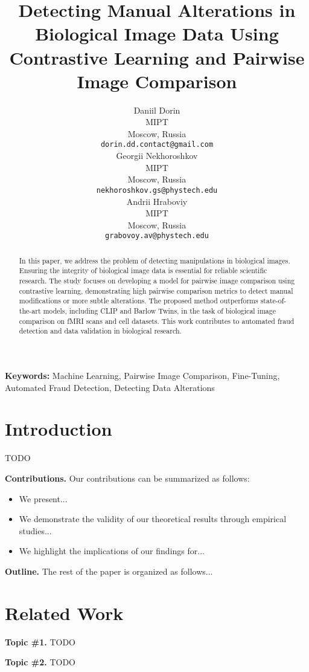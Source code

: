 \documentclass{article}
\title{Detecting Manual Alterations in Biological Image Data 
Using Contrastive Learning and Pairwise Image Comparison}
\author{%
  Daniil Dorin\\
  MIPT\\
  Moscow, Russia\\
  \texttt{dorin.dd.contact@gmail.com}\\
  \And
  Georgii Nekhoroshkov\\
  MIPT\\
  Moscow, Russia\\
  \texttt{nekhoroshkov.gs@phystech.edu}\\
  \And
  Andrii Hraboviy\\
  MIPT\\
  Moscow, Russia\\
  \texttt{grabovoy.av@phystech.edu}\\
}
\begin{document}
\maketitle

\begin{abstract}

    In this paper, we address the problem of detecting manipulations in biological images. 
    Ensuring the integrity of biological 
    image data is essential for reliable scientific research. 
    The study focuses on developing a model for pairwise image comparison
    using contrastive learning, demonstrating high pairwise comparison metrics to detect 
    manual modifications or more subtle alterations. 
    The proposed method outperforms state-of-the-art models, 
    including CLIP and Barlow Twins, in the task of biological 
    image comparison on fMRI scans and cell datasets. 
    This work contributes to automated fraud detection and data validation in 
    biological research.

\end{abstract}

\textbf{Keywords:}
Machine Learning, Pairwise Image Comparison, Fine-Tuning, Automated Fraud Detection, 
Detecting Data Alterations

\section{Introduction}\label{sec:intro}

TODO

\textbf{Contributions.} Our contributions can be summarized as follows:
\begin{itemize}
    \item We present...
    \item We demonstrate the validity of our theoretical results through empirical studies...
    \item We highlight the implications of our findings for...
\end{itemize}

\textbf{Outline.} The rest of the paper is organized as follows...

\section{Related Work}\label{sec:rw}

\textbf{Topic \#1.}
TODO

\textbf{Topic \#2.}
TODO
\end{document}
